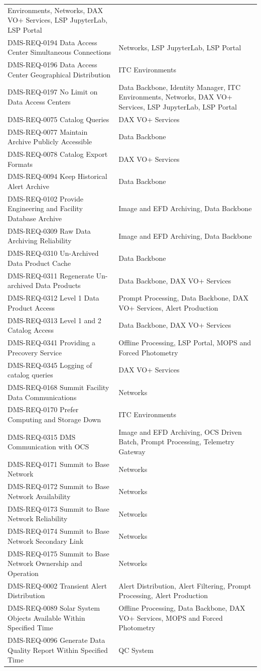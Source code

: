 \documentclass[DM,lsstdraft,toc]{lsstdoc}
\begin{document}
\begin{longtable}[]{@{}ll@{}}
Environments, Networks, DAX VO+ Services, LSP JupyterLab, LSP
Portal\tabularnewline
DMS-REQ-0194 Data Access Center Simultaneous Connections & Networks, LSP
JupyterLab, LSP Portal\tabularnewline
DMS-REQ-0196 Data Access Center Geographical Distribution & ITC
Environments\tabularnewline
DMS-REQ-0197 No Limit on Data Access Centers & Data Backbone, Identity
Manager, ITC Environments, Networks, DAX VO+ Services, LSP JupyterLab,
LSP Portal\tabularnewline
DMS-REQ-0075 Catalog Queries & DAX VO+ Services\tabularnewline
DMS-REQ-0077 Maintain Archive Publicly Accessible & Data
Backbone\tabularnewline
DMS-REQ-0078 Catalog Export Formats & DAX VO+ Services\tabularnewline
DMS-REQ-0094 Keep Historical Alert Archive & Data
Backbone\tabularnewline
DMS-REQ-0102 Provide Engineering and Facility Database Archive & Image
and EFD Archiving, Data Backbone\tabularnewline
DMS-REQ-0309 Raw Data Archiving Reliability & Image and EFD Archiving,
Data Backbone\tabularnewline
DMS-REQ-0310 Un-Archived Data Product Cache & Data
Backbone\tabularnewline
DMS-REQ-0311 Regenerate Un-archived Data Products & Data Backbone, DAX
VO+ Services\tabularnewline
DMS-REQ-0312 Level 1 Data Product Access & Prompt Processing, Data
Backbone, DAX VO+ Services, Alert Production\tabularnewline
DMS-REQ-0313 Level 1 and 2 Catalog Access & Data Backbone, DAX VO+
Services\tabularnewline
DMS-REQ-0341 Providing a Precovery Service & Offline Processing, LSP
Portal, MOPS and Forced Photometry\tabularnewline
DMS-REQ-0345 Logging of catalog queries & DAX VO+
Services\tabularnewline
DMS-REQ-0168 Summit Facility Data Communications &
Networks\tabularnewline
DMS-REQ-0170 Prefer Computing and Storage Down & ITC
Environments\tabularnewline
DMS-REQ-0315 DMS Communication with OCS & Image and EFD Archiving, OCS
Driven Batch, Prompt Processing, Telemetry Gateway\tabularnewline
DMS-REQ-0171 Summit to Base Network & Networks\tabularnewline
DMS-REQ-0172 Summit to Base Network Availability &
Networks\tabularnewline
DMS-REQ-0173 Summit to Base Network Reliability &
Networks\tabularnewline
DMS-REQ-0174 Summit to Base Network Secondary Link &
Networks\tabularnewline
DMS-REQ-0175 Summit to Base Network Ownership and Operation &
Networks\tabularnewline
DMS-REQ-0002 Transient Alert Distribution & Alert Distribution, Alert
Filtering, Prompt Processing, Alert Production\tabularnewline
DMS-REQ-0089 Solar System Objects Available Within Specified Time &
Offline Processing, Data Backbone, DAX VO+ Services, MOPS and Forced
Photometry\tabularnewline
DMS-REQ-0096 Generate Data Quality Report Within Specified Time & QC
System\tabularnewline

\end{longtable}
\end{document}
